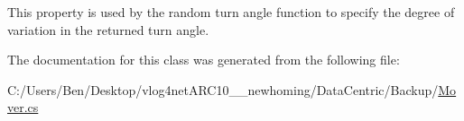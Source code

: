 This property is used by the random turn angle function to specify the degree of variation in the returned turn angle. 



The documentation for this class was generated from the following file\-:\begin{DoxyCompactItemize}
\item 
C\-:/\-Users/\-Ben/\-Desktop/vlog4net\-A\-R\-C10\-\_\-\_\-newhoming/\-Data\-Centric/\-Backup/\hyperlink{_backup_2_mover_8cs}{Mover.\-cs}\end{DoxyCompactItemize}

